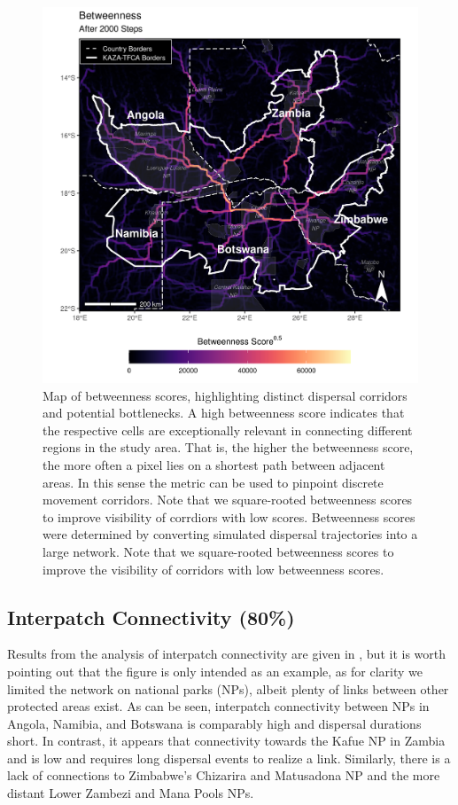 \documentclass[abstract=on,10pt,a4paper,bibliography=totocnumbered]{article}
\begin{document}
\begin{figure}
  \includegraphics[width=\textwidth]{99_Betweenness.png}
  \caption{Map of betweenness scores, highlighting distinct dispersal corridors
  and potential bottlenecks. A high betweenness score indicates that the
  respective cells are exceptionally relevant in connecting different regions in
  the study area. That is, the higher the betweenness score, the more often a
  pixel lies on a shortest path between adjacent areas. In this sense the metric
  can be used to pinpoint discrete movement corridors. Note that we
  square-rooted betweenness scores to improve visibility of corrdiors with low
  scores. Betweenness scores were determined by converting simulated dispersal
  trajectories into a large network. Note that we square-rooted betweenness
  scores to improve the visibility of corridors with low betweenness scores.}
  \label{Betweenness}
\end{figure}

\subsection{Interpatch Connectivity (80\%)}
Results from the analysis of interpatch connectivity are given in
, but it is worth pointing out that the figure is only
intended as an example, as for clarity we limited the network on national parks
(NPs), albeit plenty of links between other protected areas exist. As can be
seen, interpatch connectivity between NPs in Angola, Namibia, and Botswana is
comparably high and dispersal durations short. In contrast, it appears that
connectivity towards the Kafue NP in Zambia and is low and requires long
dispersal events to realize a link. Similarly, there is a lack of connections to
Zimbabwe's Chizarira and Matusadona NP and the more distant Lower Zambezi and
Mana Pools NPs.
\end{document}

